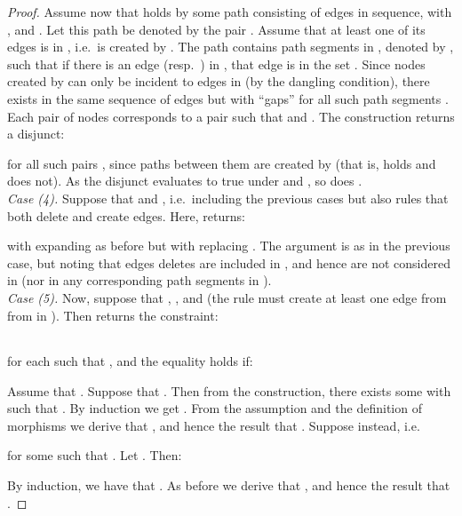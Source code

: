 \documentclass{llncs}
\begin{document}
\begin{proof}
		Assume now that  holds by some path consisting of edges  in sequence, with , and . Let this path be denoted by the pair . Assume that at least one of its edges is in , i.e.\ is created by . The path contains path segments  in , denoted by , such that if there is an edge  (resp.\ ) in , that edge is in the set . Since nodes created by  can only be incident to edges in  (by the dangling condition), there exists in  the same sequence of edges  but with ``gaps'' for all such path segments . Each pair of nodes  corresponds to a pair  such that  and . The construction returns a disjunct:		
		
		
		\noindent for all such pairs , since paths between them are created by  (that is,  holds and  does not). As the disjunct evaluates to true under  and , so does .\\
		
		
		\noindent\emph{Case (4).} Suppose that  and , i.e.\ including the previous cases but also rules that both delete and create edges. Here,  returns:
		
		
		\noindent with  expanding as before but with  replacing . The argument is as in the previous case, but noting that edges  deletes are included in , and hence are not considered in  (nor in any corresponding path segments in ).\\
		
		\noindent\emph{Case (5).} Now, suppose that , , and  (the rule must create at least one edge from from  in ). Then  returns the constraint:
		
		\begin{center}\begin{tabular}{c}
			\\
		 
		\end{tabular}\end{center}
		
		\noindent for each  such that , and the equality holds if: 
		
		\noindent Assume that . Suppose that . Then from the construction, there exists some  with  such that . By induction we get . From the assumption  and the definition of morphisms we derive that , and hence the result that . Suppose  instead, i.e. 
		
		
		\noindent for some  such that . Let . Then:
		
		
		\noindent By induction, we have that . As before we derive that , and hence the result that .
		


\end{proof}
\end{document}
